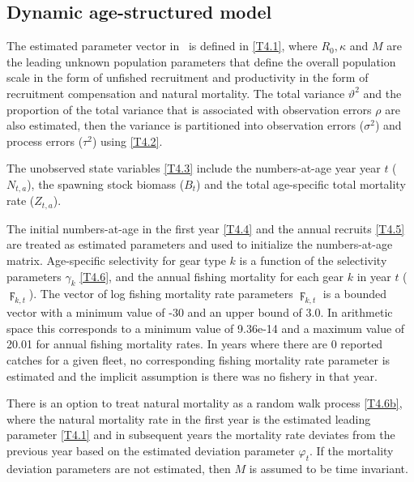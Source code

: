 		
		\subsection{Dynamic age-structured model}

The estimated parameter vector in \iscam\ is defined in \eqref{T4.1}, where $R_0, \kappa$ and $M$ are the leading unknown population parameters that define the overall population scale in the form of unfished recruitment and productivity in the form of recruitment compensation and natural mortality.  The total variance $\vartheta^2$ and the proportion of the total variance that is associated with observation errors $\rho$ are also estimated, then the variance is partitioned into observation errors ($\sigma^2$) and process errors ($\tau^2$) using \eqref{T4.2}.

The unobserved state variables \eqref{T4.3} include the numbers-at-age year year $t$ ($N_{t,a}$), the spawning stock biomass ($B_t$) and the total age-specific total mortality rate ($Z_{t,a}$).

The initial numbers-at-age in the first year \eqref{T4.4} and the annual recruits \eqref{T4.5} are treated as estimated parameters and used to initialize the numbers-at-age matrix.  Age-specific selectivity for gear type $k$ is a function of the selectivity parameters $\gamma_k$ \eqref{T4.6}, and the annual fishing mortality for each gear $k$ in year $t$ ($\digamma_{k,t}$).  The vector of log fishing mortality rate parameters $\digamma_{k,t}$ is a bounded vector with a minimum value of -30 and an upper bound of 3.0.  In arithmetic space this corresponds to a minimum value of 9.36e-14 and a maximum value of 20.01 for annual fishing mortality rates.  In years where there are 0 reported catches for a given fleet, no corresponding fishing mortality rate parameter is estimated and the implicit assumption is there was no fishery in that year.

There is an option to treat natural mortality as a random walk process \eqref{T4.6b}, where the natural mortality rate in the first year is the estimated leading parameter \eqref{T4.1} and in subsequent years the mortality rate deviates from the previous year based on the estimated deviation parameter $\varphi_t$.  If the mortality deviation parameters are not estimated, then $M$ is assumed to be time invariant. 



